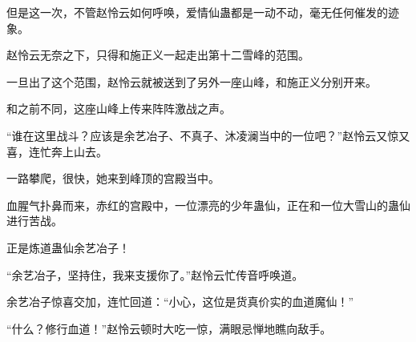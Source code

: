 \begin{this_body}
但是这一次，不管赵怜云如何呼唤，爱情仙蛊都是一动不动，毫无任何催发的迹象。

赵怜云无奈之下，只得和施正义一起走出第十二雪峰的范围。

一旦出了这个范围，赵怜云就被送到了另外一座山峰，和施正义分别开来。

和之前不同，这座山峰上传来阵阵激战之声。

“谁在这里战斗？应该是余艺冶子、不真子、沐凌澜当中的一位吧？”赵怜云又惊又喜，连忙奔上山去。

一路攀爬，很快，她来到峰顶的宫殿当中。

血腥气扑鼻而来，赤红的宫殿中，一位漂亮的少年蛊仙，正在和一位大雪山的蛊仙进行苦战。

正是炼道蛊仙余艺冶子！

“余艺冶子，坚持住，我来支援你了。”赵怜云忙传音呼唤道。

余艺冶子惊喜交加，连忙回道：“小心，这位是货真价实的血道魔仙！”

“什么？修行血道！”赵怜云顿时大吃一惊，满眼忌惮地瞧向敌手。

\end{this_body}

